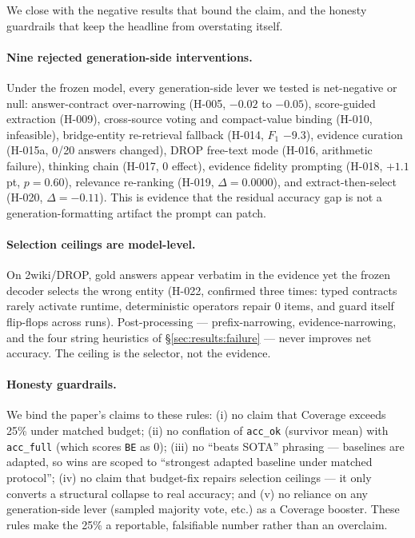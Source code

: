 We close with the negative results that bound the claim, and the honesty
guardrails that keep the headline from overstating itself.

\paragraph{Nine rejected generation-side interventions.} Under the frozen
model, every generation-side lever we tested is net-negative or null:
answer-contract over-narrowing (H-005, $-0.02$ to $-0.05$), score-guided
extraction (H-009), cross-source voting and compact-value binding (H-010,
infeasible), bridge-entity re-retrieval fallback (H-014, $F_1$ $-9.3$),
evidence curation (H-015a, 0/20 answers changed), DROP free-text mode
(H-016, arithmetic failure), thinking chain (H-017, 0 effect), evidence
fidelity prompting (H-018, $+1.1$pt, $p=0.60$), relevance re-ranking (H-019,
$\Delta=0.0000$), and extract-then-select (H-020, $\Delta=-0.11$). This is
evidence that the residual accuracy gap is not a generation-formatting
artifact the prompt can patch.

\paragraph{Selection ceilings are model-level.} On 2wiki/DROP, gold answers
appear verbatim in the evidence yet the frozen decoder selects the wrong
entity (H-022, confirmed three times: typed contracts rarely activate
runtime, deterministic operators repair 0 items, and guard itself
flip-flops across runs). Post-processing --- prefix-narrowing,
evidence-narrowing, and the four string heuristics of
\S\ref{sec:results:failure} --- never improves net accuracy. The ceiling is
the selector, not the evidence.

\paragraph{Honesty guardrails.} We bind the paper's claims to these rules:
(i) no claim that Coverage exceeds 25\% under matched budget; (ii) no
conflation of \texttt{acc\_ok} (survivor mean) with \texttt{acc\_full}
(which scores \texttt{BE} as 0); (iii) no ``beats SOTA'' phrasing ---
baselines are adapted, so wins are scoped to ``strongest adapted baseline
under matched protocol''; (iv) no claim that budget-fix repairs selection
ceilings --- it only converts a structural collapse to real accuracy; and
(v) no reliance on any generation-side lever (sampled majority vote, etc.)
as a Coverage booster. These rules make the 25\% a reportable, falsifiable
number rather than an overclaim.
